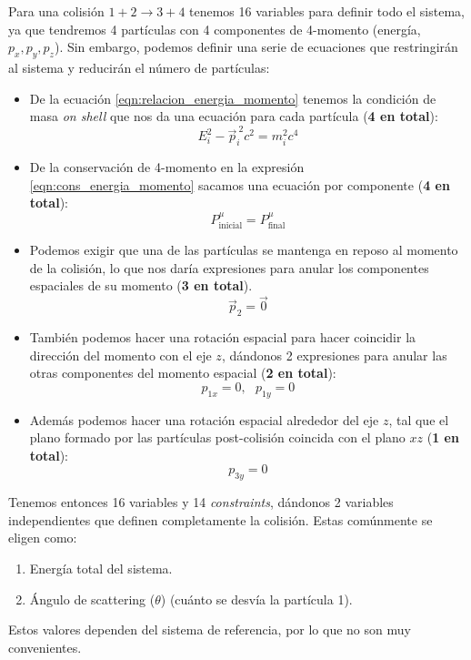 \documentclass[]{article}
\numberwithin{equation}{section}
\begin{document}
Para una colisión \(1+2\rightarrow 3+4\) tenemos 16 variables para definir todo el sistema, ya que tendremos 4 partículas con 4 componentes de 4-momento (energía, \(p_x,p_y,p_z\)). Sin embargo, podemos definir una serie de ecuaciones que restringirán al sistema y reducirán el número de partículas:
\begin{itemize}
	\item De la ecuación \ref{eqn:relacion_energia_momento} tenemos la condición de masa \textit{on shell} que nos da una ecuación para cada partícula (\textbf{4 en total}):
	\begin{equation*}
		E_i^2 - \vec{p}_i^{\ 2}c^2 = m_i^2c^4
	\end{equation*}
	\item De la conservación de 4-momento en la expresión \ref{eqn:cons_energia_momento} sacamos una ecuación por componente (\textbf{4 en total}):
	\begin{equation*}
		P^\mu_{\text{inicial}} = P^\mu_{\text{final}}
	\end{equation*}
	\item Podemos exigir que una de las partículas se mantenga en reposo al momento de la colisión, lo que nos daría expresiones para anular los componentes espaciales de su momento (\textbf{3 en total}).
	\begin{equation*}
		\vec{p}_2 = \vec{0}
	\end{equation*}
	\item También podemos hacer una rotación espacial para hacer coincidir la dirección del momento con el eje \(z\), dándonos 2 expresiones para anular las otras componentes del momento espacial (\textbf{2 en total}):
	\begin{equation*}
		p_{1x} = 0,\ \ \ p_{1y} = 0
	\end{equation*}
	\item Además podemos hacer una rotación espacial alrededor del eje \(z\), tal que el plano formado por las partículas post-colisión coincida con el plano \(xz\) (\textbf{1 en total}):
	\begin{equation*}
	p_{3y} = 0
	\end{equation*}
\end{itemize}

Tenemos entonces 16 variables y 14 \textit{constraints}, dándonos 2 variables independientes que definen completamente la colisión. Estas comúnmente se eligen como:
\begin{enumerate}
	\item Energía total del sistema.
	\item Ángulo de scattering (\(\theta\)) (cuánto se desvía la partícula 1).
\end{enumerate}
Estos valores dependen del sistema de referencia, por lo que no son muy convenientes.
\end{document}
